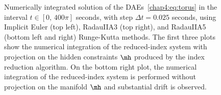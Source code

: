 \begin{figure}[htb]
  \centering
  \small{}%
  \hspace{0.25cm}%
  \small{}
  \small{}%
  \hspace{0.25cm}%
  \small{}
  \caption{Numerically integrated solution of the \acp{DAE}~\eqref{chap4:eq:torus} in the interval $t \in [0, \, 400\pi]$ seconds, with step $\Delta t = 0.025$ seconds, using Implicit Euler (top left), RadauIIA3 (top right), and RadauIIA5 (bottom left and right) Runge-Kutta methods. The first three plots show the numerical integration of the reduced-index system with projection on the hidden constraints $\mh$ produced by the index reduction algorithm. On the bottom right plot, the numerical integration of the reduced-index system is performed without projection on the manifold $\mh$ and substantial drift is observed.}
  \label{chap4:fig:torus_integration}
\end{figure}

